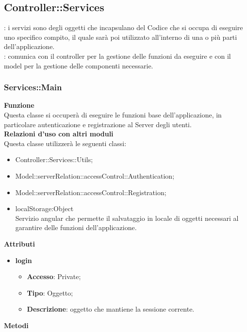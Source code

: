 {	\subsection {Controller::\-Services}{
		\label{sec:services}
		\textbf{\tipo}: i servizi sono degli oggetti che incapsulano del Codice che si occupa di eseguire uno specifico compito, il quale sarà poi utilizzato all’interno di una o più parti dell’applicazione.\\
		\textbf{\relaz}: comunica con il controller per la gestione delle funzioni da eseguire e con il model per la gestione delle componenti necessarie.

		\subsubsection{Services::\-Main}{
			\label{sub:servicesMain}
			\textbf{Funzione}\\
			\indent Questa classe si occuperà di eseguire le funzioni base dell'applicazione, in particolare autenticazione e registrazione al Server degli utenti.\\
			\textbf{Relazioni d'uso con altri moduli}\\
			\indent Questa classe utilizzerà le seguenti classi:
			\begin{itemize}
				\item Controller::Services::\-Utils;
				\item Model::serverRelation::accessControl::Authentication;
				\item Model::serverRelation::accessControl::Registration;
				\item localStorage:Object\\
					\indent Servizio angular che permette il salvataggio in locale di oggetti necessari al  garantire delle funzioni dell'applicazione.
			\end{itemize}
			\textbf{Attributi}
			\begin{itemize}
				\item \textbf{login}
				\begin{itemize}
					\item \textbf{Accesso}: Private;
					\item \textbf{Tipo}: Oggetto;
					\item \textbf{Descrizione}: oggetto che mantiene la sessione corrente.
				\end{itemize}
			\end{itemize}
			\textbf{Metodi}
			\begin{itemize}

\end{itemize}}}}
